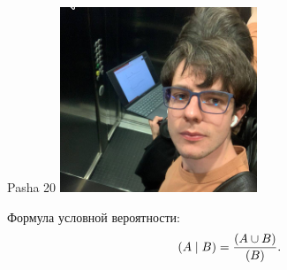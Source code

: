 \documentclass[12pt]{article}
\let\P\relax
\DeclareMathOperator{\P}{\mathbb{P}}
\begin{document}
\begin{minipage}{0.45\textwidth}
\begin{tinderm}{Pasha 20}
\includegraphics[width=\textwidth]{tinder-photo/pasha.png}

  

\begin{mybox}
Формула условной вероятности:
\[
\P(A \mid B) = \frac{\P(A \cup  B)}{\P(B)}.
\]
\end{mybox}
\end{tinderm}
\end{minipage}
%
%
\end{document}

